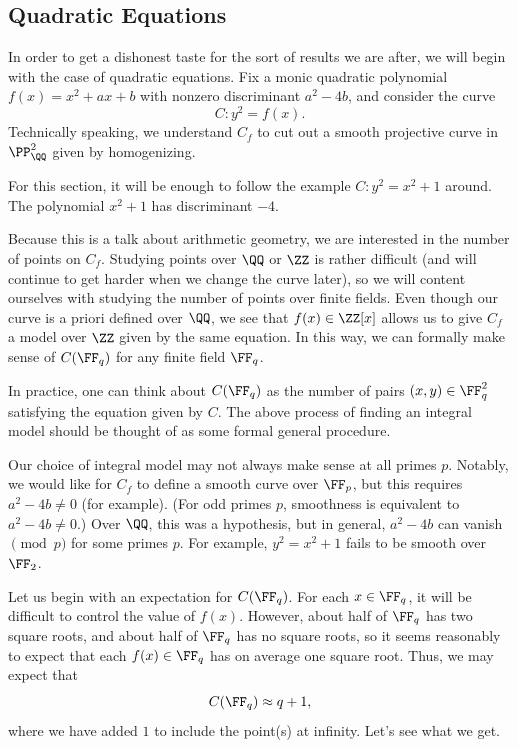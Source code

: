 \documentclass{article}
\begin{document}
\subsection{Quadratic Equations}
In order to get a dishonest taste for the sort of results we are after, we will begin with the case of quadratic equations. Fix a monic quadratic polynomial $f(x)=x^2+ax+b$ with nonzero discriminant $a^2-4b$, and consider the curve
\[C\colon y^2=f(x).\]
Technically speaking, we understand $C_f$ to cut out a smooth projective curve in $\PP^2_\QQ$ given by homogenizing.
\begin{example}
	For this section, it will be enough to follow the example $C\colon y^2=x^2+1$ around. The polynomial $x^2+1$ has discriminant $-4$.
\end{example}
Because this is a talk about arithmetic geometry, we are interested in the number of points on $C_f$. Studying points over $\QQ$ or $\ZZ$ is rather difficult (and will continue to get harder when we change the curve later), so we will content ourselves with studying the number of points over finite fields. Even though our curve is a priori defined over $\QQ$, we see that $f(x)\in\ZZ[x]$ allows us to give $C_f$ a model over $\ZZ$ given by the same equation. In this way, we can formally make sense of $C(\FF_q)$ for any finite field $\FF_q$.
\begin{remark}
	In practice, one can think about $C(\FF_q)$ as the number of pairs $(x,y)\in\FF_q^2$ satisfying the equation given by $C$. The above process of finding an integral model should be thought of as some formal general procedure.
\end{remark}
\begin{remark}
	Our choice of integral model may not always make sense at all primes $p$. Notably, we would like for $C_f$ to define a smooth curve over $\FF_p$, but this requires $a^2-4b\ne0$ (for example). (For odd primes $p$, smoothness is equivalent to $a^2-4b\ne0$.) Over $\QQ$, this was a hypothesis, but in general, $a^2-4b$ can vanish$\pmod p$ for some primes $p$. For example, $y^2=x^2+1$ fails to be smooth over $\FF_2$.
\end{remark}
Let us begin with an expectation for $C(\FF_q)$. For each $x\in\FF_q$, it will be difficult to control the value of $f(x)$. However, about half of $\FF_q$ has two square roots, and about half of $\FF_q$ has no square roots, so it seems reasonably to expect that each $f(x)\in\FF_q$ has on average one square root. Thus, we may expect that
\[C(\FF_q)\approx q+1,\]
where we have added $1$ to include the point(s) at infinity. Let's see what we get.
\end{document}

